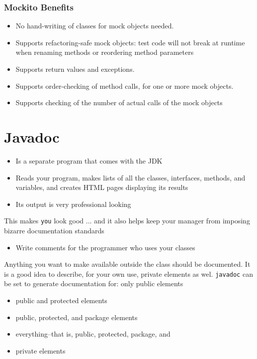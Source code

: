 \documentclass[10pt]{article}
\begin{document}
    \subsubsection{Mockito Benefits}
    \begin{itemize}
    	\item No hand-writing of classes for mock objects needed.
    	\item Supports refactoring-safe mock objects: test code will not break at runtime when renaming methods or reordering method parameters
    	\item Supports return values and exceptions.
    	\item Supports order-checking of method calls, for one or more mock objects.
    	\item Supports checking of the number of actual calls of the mock objects
    \end{itemize}
    
	\newpage
		
	
    \section{Javadoc}
    \begin{itemize}
        \item Is a separate program that comes with the JDK
        \item Reads your program, makes lists of all the classes, interfaces, methods, and variables, and creates HTML pages displaying its results
        \item Its output is very professional looking
    \end{itemize}

    This makes \texttt{you} look good ... and it also helps keep your manager from imposing bizarre documentation standards
    \begin{itemize}
        \item Write comments for the programmer who uses your classes
    \end{itemize}
    Anything you want to make available outside the class should be documented. It is a good idea to describe, for your own use, private elements as wel. \texttt{javadoc} can be set to generate documentation for: only public elements
    \begin{itemize}
        \item public and protected elements
        \item public, protected, and package elements
        \item everything--that is, public, protected, package, and
        \item private elements
    \end{itemize}
\end{document}
